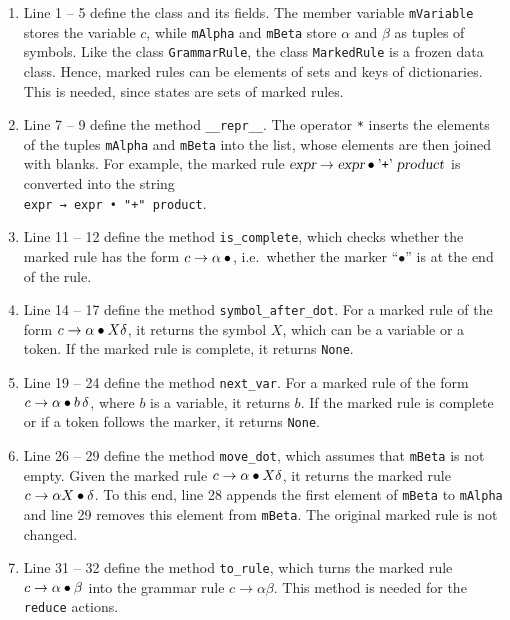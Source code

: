 \begin{enumerate}
\item Line 1 -- 5 define the class and its fields.  The member variable \texttt{mVariable} stores the variable
      $c$, while \texttt{mAlpha} and \texttt{mBeta} store $\alpha$ and $\beta$ as tuples of symbols.  Like the class
      \texttt{GrammarRule}, the class \texttt{MarkedRule} is a frozen data class.  Hence, marked rules can be
      elements of sets and keys of dictionaries.  This is needed, since states are sets of marked rules.
\item Line 7 -- 9 define the method \texttt{\_\_repr\_\_}.  The operator \texttt{*} inserts the elements of the
      tuples \texttt{mAlpha} and \texttt{mBeta} into the list, whose elements are then joined with blanks.  For
      example, the marked rule $\textsl{expr} \rightarrow \textsl{expr} \mdot \saquoted{+}\; \textsl{product}$ is
      converted into the string
      \\[0.2cm]
      \hspace*{1.3cm}
      \texttt{expr → expr • "+" product}.
\item Line 11 -- 12 define the method \texttt{is\_complete}, which checks whether the marked rule has the form
      $c \rightarrow \alpha \mdot$, i.e.~whether the marker ``$\bullet$'' is at the end of the rule.
\item Line 14 -- 17 define the method \texttt{symbol\_after\_dot}.  For a marked rule of the form
      $c \rightarrow \alpha \mdot X \delta$, it returns the symbol $X$, which can be a variable or a token.  If the
      marked rule is complete, it returns \texttt{None}.
\item Line 19 -- 24 define the method \texttt{next\_var}.  For a marked rule of the form
      $c \rightarrow \alpha \mdot b\, \delta$, where $b$ is a variable, it returns $b$.  If the marked rule is
      complete or if a token follows the marker, it returns \texttt{None}.
\item Line 26 -- 29 define the method \texttt{move\_dot}, which assumes that \texttt{mBeta} is not empty.  Given the
      marked rule $c \rightarrow \alpha \mdot X \delta$, it returns the marked rule
      $c \rightarrow \alpha X \mdot \delta$.  To this end, line 28 appends the first element of \texttt{mBeta} to
      \texttt{mAlpha} and line 29 removes this element from \texttt{mBeta}.  The original marked rule is not changed.
\item Line 31 -- 32 define the method \texttt{to\_rule}, which turns the marked rule
      $c \rightarrow \alpha \mdot \beta$ into the grammar rule $c \rightarrow \alpha \beta$.  This method is
      needed for the \texttt{reduce} actions.
\end{enumerate}

